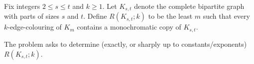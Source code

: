 Fix integers $2\le s\le t$ and $k\ge 1$.
Let $K_{s,t}$ denote the complete bipartite graph with parts of sizes $s$ and $t$.
Define $R(K_{s,t};k)$ to be the least $m$ such that every $k$-edge-colouring of $K_m$ contains a monochromatic copy of $K_{s,t}$.

The problem asks to determine (exactly, or sharply up to constants/exponents) $R(K_{s,t};k)$.
